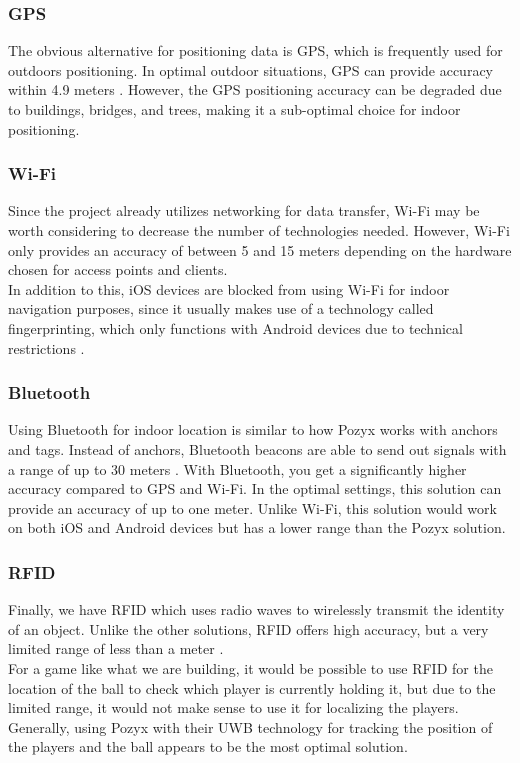 \subsubsection{GPS}
The obvious alternative for positioning data is GPS, which is frequently used for outdoors positioning.
In optimal outdoor situations, GPS can provide accuracy within 4.9 meters \cite{gpsgov:accuracy}.
However, the GPS positioning accuracy can be degraded due to buildings, bridges, and trees, making it a sub-optimal choice for indoor positioning.

\subsubsection{Wi-Fi}
Since the project already utilizes networking for data transfer, Wi-Fi may be worth considering to decrease the number of technologies needed.
However, Wi-Fi only provides an accuracy of between 5 and 15 meters depending on the hardware chosen for access points and clients.\\
In addition to this, iOS devices are blocked from using Wi-Fi for indoor navigation purposes, since it usually makes use of a technology called fingerprinting, which only functions with Android devices due to technical restrictions \cite{infsoft:wifi}.

\subsubsection{Bluetooth}
Using Bluetooth for indoor location is similar to how Pozyx works with anchors and tags.
Instead of anchors, Bluetooth beacons are able to send out signals with a range of up to 30 meters \cite{infsoft:bluetooth}.
With Bluetooth, you get a significantly higher accuracy compared to GPS and Wi-Fi.
In the optimal settings, this solution can provide an accuracy of up to one meter.
Unlike Wi-Fi, this solution would work on both iOS and Android devices but has a lower range than the Pozyx solution.

\subsubsection{RFID}
Finally, we have RFID which uses radio waves to wirelessly transmit the identity of an object.
Unlike the other solutions, RFID offers high accuracy, but a very limited range of less than a meter \cite{infsoft:rfid}.\\
For a game like what we are building, it would be possible to use RFID for the location of the ball to check which player is currently holding it, but due to the limited range, it would not make sense to use it for localizing the players.\\
Generally, using Pozyx with their UWB technology for tracking the position of the players and the ball appears to be the most optimal solution.

